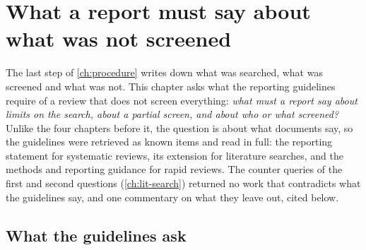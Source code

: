 \chapter{What a report must say about what was not screened}
\label{ch:reporting}


The last step of \cref{ch:procedure} writes down what was searched, what
was screened and what was not.
This chapter asks what the reporting guidelines require of a review that
does not screen everything: \emph{what must a report say about limits on
the search, about a partial screen, and about who or what screened?}
Unlike the four chapters before it, the question is about what documents
say, so the guidelines were retrieved as known items and read in full:
the reporting statement for systematic reviews, its extension for
literature searches, and the methods and reporting guidance for rapid
reviews.
The counter queries of the first and second questions
(\cref{ch:lit-search}) returned no work that contradicts what the
guidelines say, and one commentary on what they leave out, cited below.

\section{What the guidelines ask}
\label{sec:reporting-guidelines}

